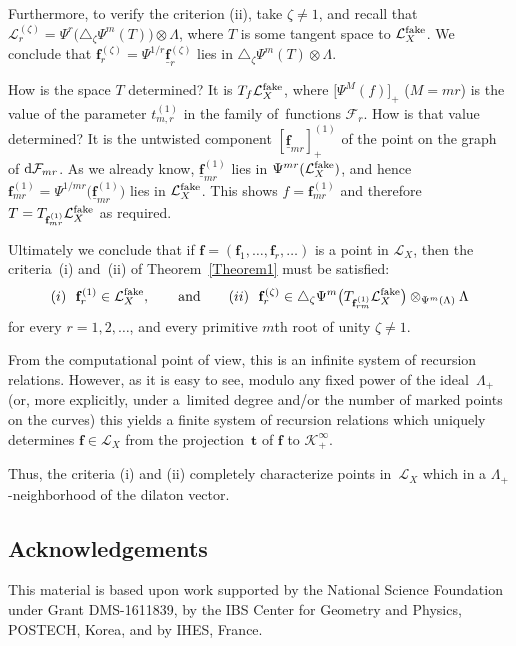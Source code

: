 \documentclass[pdftex]{sigma}
\def\F{\mathcal F}
\def\K{\mathcal K}
\def\L{\mathcal L}
\def\f{{\mathbf f}}
\def\t{{\mathbf t}}
\def\und{\underline}
\renewcommand{\Delta}{\triangle}
\begin{document}
Furthermore, to verify the criterion (ii), take $\zeta\neq 1$, and recall that
$\L_r^{(\zeta)}=\Psi^r\big(\Delta_{\zeta}\Psi^m(T)\big)\otimes \Lambda$, where $T$ is some tangent space to $\L_X^{\rm fake}$. We conclude that $\f_r^{(\zeta)}=\Psi^{1/r}\und{\f}_r^{(\zeta)}$ lies
in $\Delta_{\zeta}\Psi^m(T)\otimes \Lambda$.

How is the space $T$ determined? It is $T_f\L_X^{\rm fake}$, where
$\big[\Psi^M(f)\big]_{+}$ ($M=mr$) is the value of the parameter $t_{m,r}^{(1)}$ in the family of~functions $\F_r$. How is that value determined? It is the untwisted component $[\und{\f}_{mr}]_{+}^{(1)}$ of the point on the graph of ${\rm d}\F_{mr}$. As we already know, $\und{\f}_{mr}^{(1)}$ lies in $\Psi^{mr}(\L_X^{\rm fake})$, and hence
$\f_{mr}^{(1)}=\Psi^{1/mr}\big(\und{\f}_{mr}^{(1)}\big)$ lies in $\L_X^{\rm fake}$. This shows
$f=\f_{mr}^{(1)}$ and therefore $T = T_{\f_{mr}^{(1)}}\L_X^{\rm fake}$ as required.

Ultimately we conclude that if $\f=(\f_1,\dots, \f_r,\dots)$ is a point in $\L_X$, then the criteria~(i) and~(ii) of Theorem~\ref{Theorem1} must be satisfied:
 \[ (i)\ \ \f_r^{(1)}\in \L_X^{\rm fake}, \qquad \text{and}\qquad (ii)\ \ \f_r^{(\zeta)}\in \Delta_{\zeta}\Psi^m\big(T_{\f_{rm}^{(1)}}\L_X^{\rm fake}\big)\otimes_{\Psi^m(\Lambda)}\Lambda\]
 for every $r=1,2,\dots$, and every primitive $m$th root of unity $\zeta\neq 1$.

From the computational point of view, this is an infinite system of recursion relations. However, as it is easy to see, modulo any fixed power of the ideal~$\Lambda_{+}$ (or, more explicitly, under a~limited degree and/or the number of marked points on the curves) this yields a finite system of recursion relations which uniquely determines $\f \in \L_X$ from the projection~$\t$ of $\f$ to $\K_{+}^{\infty}$.

Thus, the criteria (i) and (ii) completely characterize points in~$\L_X$ which in a $\Lambda_{+}$-neighbor\-hood of the dilaton vector.

\vspace{-2mm}

\subsection*{Acknowledgements}
\vspace{-1mm}

This material is based upon work supported by the National
Science Foundation under Grant DMS-1611839, by the IBS Center for Geometry
and Physics, POSTECH, Korea, and by IHES, France.
\end{document}
